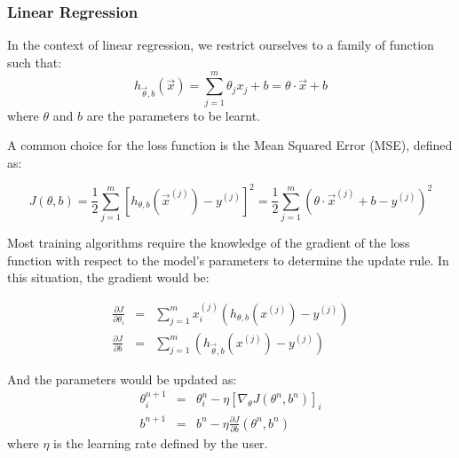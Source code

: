 \subsubsection{Linear Regression}
\label{subsubsec:linear-regression}
In the context of linear regression, we restrict ourselves to a family of function such that:
\begin{equation}
h_{\vec{\theta},b} ( \vec{x} ) = \sum_{j = 1}^{m} \theta_j x_j + b = \theta \cdot \vec{x} + b
\end{equation}
where $\theta$ and $b$ are the parameters to be learnt.

A common choice for the loss function is the Mean Squared Error (MSE), defined as:

\begin{equation}
J \left( \theta , b\right) = \frac{1}{2} \sum_{j=1}^m \left[ h_{\theta,b} \left( \vec{x}^{(j)} \right) -  y^{(j)} \right]^2 =  \frac{1}{2} \sum_{j=1}^m \left( \theta \cdot \vec{x}^{(j)} + b - y ^{(j)} \right) ^2
\label{eq:MSE-definition}
\end{equation}

Most training algorithms require the knowledge of the gradient of the loss function with respect to the model's parameters to determine the update rule. In this situation, the gradient would be:

\begin{eqnarray}
\frac{ \partial J}{\partial \theta_i } &=& \sum _{j= 1}^m x_i^{(j)} (  h_{\theta, b} ( x^{(j)}) - y^{(j)} ) \\
\frac{ \partial J}{\partial b } &=&  \sum _{j= 1}^m (  h_{\vec{\theta}, b} ( x^{(j)}) - y^{(j)} )
\label{eq:MSE-gradient}
\end{eqnarray}

And the parameters would be updated as:
\begin{eqnarray}
\theta_i^{n+1} &=& \theta_i^{n} - \eta \left[\nabla_{\theta} J(\theta^n,b^n )\right]_i \\
b^{n+1} &=& b^n - \eta \frac{\partial J}{\partial b} \left(\theta^n,b^n \right)
\label{eq:GD-update-rule}
\end{eqnarray}
where $\eta$ is the learning rate defined by the user.


